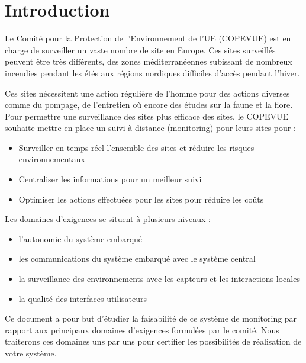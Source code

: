 \section{Introduction}

Le Comité pour la Protection de l'Environnement de l'UE (COPEVUE) est en charge de surveiller un vaste nombre de site en Europe. Ces sites surveillés peuvent être très différents, des zones méditerranéennes subissant de nombreux incendies pendant les étés aux régions nordiques difficiles d'accès pendant l'hiver. 

Ces sites nécessitent une action régulière de l'homme pour des actions diverses comme du pompage, de l'entretien où encore des études sur la faune et la flore. Pour permettre une surveillance des sites plus efficace des sites, le COPEVUE souhaite mettre en place un suivi à distance (monitoring) pour leurs sites pour : 

\begin{itemize}
\item Surveiller en temps réel l'ensemble des sites et réduire les risques environnementaux
\item Centraliser les informations pour un meilleur suivi
\item Optimiser les actions effectuées pour les sites pour réduire les coûts
\end{itemize}

Les domaines d'exigences se situent à plusieurs niveaux : 

\begin{itemize}
\item l'autonomie du système embarqué
\item les communications du système embarqué avec le système central
\item la surveillance des environnements avec les capteurs et les interactions locales
\item la qualité des interfaces utilisateurs
\end{itemize}

Ce document a pour but d'étudier la faisabilité de ce système de monitoring par rapport aux principaux domaines d'exigences formulées par le comité. Nous traiterons ces domaines uns par uns pour certifier les possibilités de réalisation de votre système.

\vfill
\pagebreak
